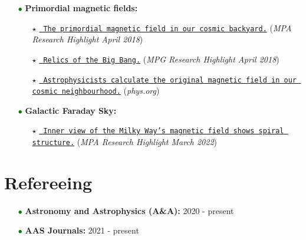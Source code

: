 \documentclass[11pt,a4paper,sans, table, dvipsnames]{moderncv}        %
\begin{document}
\begin{itemize}
\item[\textcolor{Green}{$\bullet$}] \textbf{Primordial magnetic fields:}
\vspace{0.2\baselineskip}
\begin{itemize}
\item[\textcolor{Black}{$\star$}]
\href{https://www.mpa-garching.mpg.de/498249/hl201804}{\texttt{{\color{blue} The primordial magnetic field in our cosmic backyard.}}}
(\textit{MPA Research Highlight April 2018})
\item[\textcolor{Black}{$\star$}]
\href{https://www.mpg.de/11991394/relics-of-the-big-bang}{\texttt{{\color{blue} Relics of the Big Bang.}}} (\textit{MPG Research Highlight April 2018})
\item[\textcolor{Black}{$\star$}]
\href{https://phys.org/news/2018-04-astrophysicists-magnetic-field-cosmic-neighbourhood.html}{\texttt{{\color{blue} Astrophysicists calculate the original magnetic field in our cosmic neighbourhood.}}} (\textit{phys.org})
\end{itemize}
\vspace{0.4\baselineskip}
\item[\textcolor{Green}{$\bullet$}] \textbf{Galactic Faraday Sky:}
\vspace{0.2\baselineskip}
\begin{itemize}
\item[\textcolor{Black}{$\star$}]
\href{https://www.mpa-garching.mpg.de/1050627/hl202203}{\texttt{{\color{blue} Inner view of the Milky Way’s magnetic field shows spiral structure.}}} (\textit{MPA Research Highlight March 2022})
\end{itemize}
\end{itemize}

\vspace{\baselineskip}
\section{Refereeing}
\begin{itemize}
\item[\textcolor{Green}{$\bullet$}] \textbf{Astronomy and Astrophysics (A\&A):} 2020 - present
\item[\textcolor{Green}{$\bullet$}] \textbf{AAS Journals:} 2021 - present
\end{itemize}

\vspace{\baselineskip}
\end{document}
